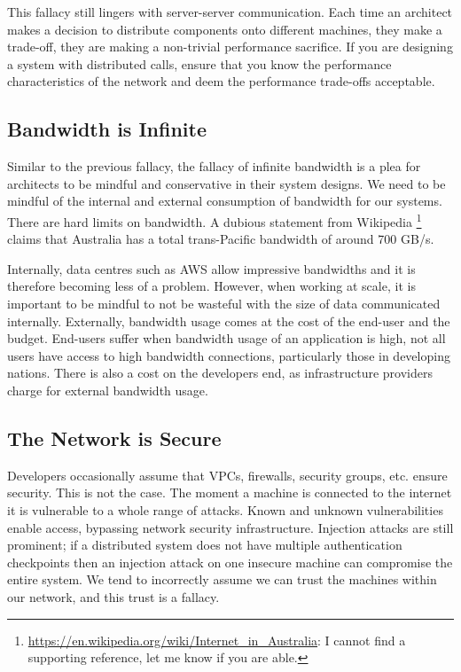 This fallacy still lingers with server-server communication.
Each time an architect makes a decision to distribute components onto different machines,
they make a trade-off,
they are making a non-trivial performance sacrifice.
If you are designing a system with distributed calls,
ensure that you know the performance characteristics of the network and deem the performance trade-offs acceptable.

\subsection{Bandwidth is Infinite}
Similar to the previous fallacy,
the fallacy of infinite bandwidth is a plea for architects to be mindful and conservative in their system designs.
We need to be mindful of the internal and external consumption of bandwidth for our systems.
There are hard limits on bandwidth.
A dubious statement from Wikipedia%
\footnote{\url{https://en.wikipedia.org/wiki/Internet_in_Australia}: I cannot find a supporting reference, let me know if you are able.} %
claims that Australia has a total trans-Pacific bandwidth of around 700 GB/s.

Internally, data centres such as AWS allow impressive bandwidths and it is therefore becoming less of a problem.
However, when working at scale,
it is important to be mindful to not be wasteful with the size of data communicated internally.
Externally, bandwidth usage comes at the cost of the end-user and the budget.
End-users suffer when bandwidth usage of an application is high,
not all users have access to high bandwidth connections, particularly those in developing nations.
There is also a cost on the developers end, as infrastructure providers charge for external bandwidth usage.

\subsection{The Network is Secure}
Developers occasionally assume that VPCs, firewalls, security groups, etc. ensure security.
This is not the case.
The moment a machine is connected to the internet it is vulnerable to a whole range of attacks.
Known and unknown vulnerabilities enable access, bypassing network security infrastructure.
Injection attacks are still prominent;
if a distributed system does not have multiple authentication checkpoints then an injection attack on one insecure machine can compromise the entire system.
We tend to incorrectly assume we can trust the machines within our network,
and this trust is a fallacy.

